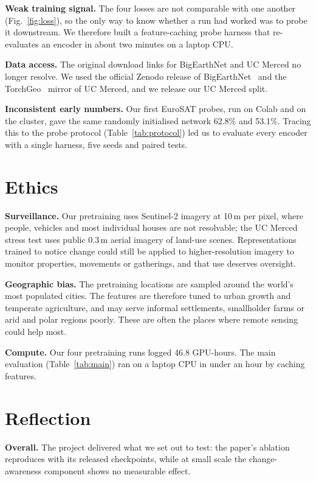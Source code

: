 \documentclass[conference]{IEEEtran}
\begin{document}
\textbf{Weak training signal.} The four losses are not comparable with one
another (Fig.~\ref{fig:loss}), so the only way to know whether a run had worked
was to probe it downstream. We therefore built a feature-caching probe harness
that re-evaluates an encoder in about two minutes on a laptop CPU.

\textbf{Data access.} The original download links for BigEarthNet and UC Merced
no longer resolve. We used the official Zenodo release of
BigEarthNet~\cite{sumbul2019bigearthnet} and the TorchGeo~\cite{stewart2022torchgeo}
mirror of UC Merced, and we release our UC Merced split.

\textbf{Inconsistent early numbers.} Our first EuroSAT probes, run on Colab and on
the cluster, gave the same randomly initialised network 62.8\% and 53.1\%.
Tracing this to the probe protocol (Table~\ref{tab:protocol}) led us to evaluate
every encoder with a single harness, five seeds and paired tests.

\section{Ethics}
\textbf{Surveillance.} Our pretraining uses Sentinel-2 imagery at 10\,m per pixel,
where people, vehicles and most individual houses are not resolvable; the UC Merced
stress test uses public 0.3\,m aerial imagery of land-use scenes.
Representations trained to notice change could still be applied to
higher-resolution imagery to monitor properties, movements or gatherings, and
that use deserves oversight.

\textbf{Geographic bias.} The pretraining locations are sampled around the world's
most populated cities. The features are therefore tuned to urban growth and
temperate agriculture, and may serve informal settlements, smallholder farms or
arid and polar regions poorly. These are often the places where remote sensing
could help most.

\textbf{Compute.} Our four pretraining runs logged 46.8 GPU-hours. The main
evaluation (Table~\ref{tab:main}) ran on a laptop CPU in under an hour by
caching features.

\section{Reflection}
\textbf{Overall.} The project delivered what we set out to test: the paper's
ablation reproduces with its released checkpoints, while at small scale the
change-awareness component shows no measurable effect.
\end{document}
